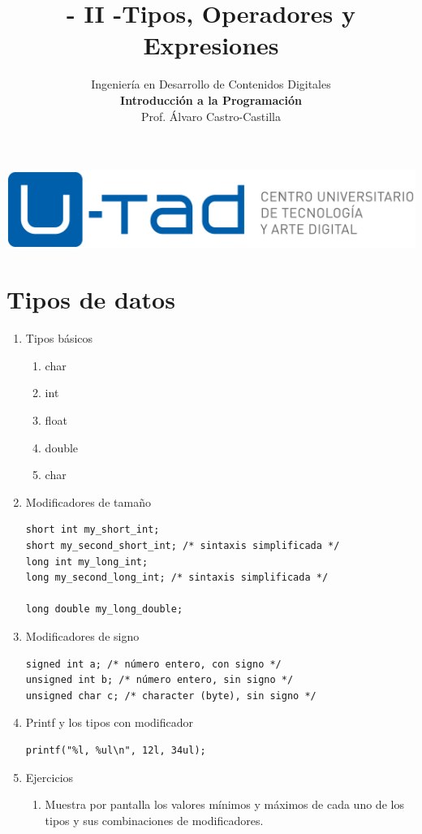 \documentclass[a4paper,oneside]{article}
\title{- II -\linebreak Tipos, Operadores y Expresiones}
\author{Ingeniería en Desarrollo de Contenidos Digitales\\ \textbf{Introducción a la Programación}\\ Prof. Álvaro Castro-Castilla}
\date{}
\begin{document}
\maketitle

\begin{center}
\includegraphics[scale=0.3,resolution=300]{images/utad.png}
\end{center}


\section{Tipos de datos}
  \begin{enumerate}
  \item Tipos básicos
    \begin{enumerate}
    \item char
    \item int
    \item float
    \item double
    \item char
    \end{enumerate}

  \item Modificadores de tamaño

    \begin{verbatim}
short int my_short_int;
short my_second_short_int; /* sintaxis simplificada */
long int my_long_int;
long my_second_long_int; /* sintaxis simplificada */

long double my_long_double;
    \end{verbatim}

  \item Modificadores de signo

    \begin{verbatim}
signed int a; /* número entero, con signo */
unsigned int b; /* número entero, sin signo */
unsigned char c; /* character (byte), sin signo */
    \end{verbatim}

  \item Printf y los tipos con modificador

    \begin{verbatim}
printf("%l, %ul\n", 12l, 34ul);
    \end{verbatim}

  \item Ejercicios
    \begin{enumerate}
    \item Muestra por pantalla los valores mínimos y máximos de cada uno de los tipos y sus combinaciones de modificadores.
    \end{enumerate}
  \end{enumerate}
\end{document}
